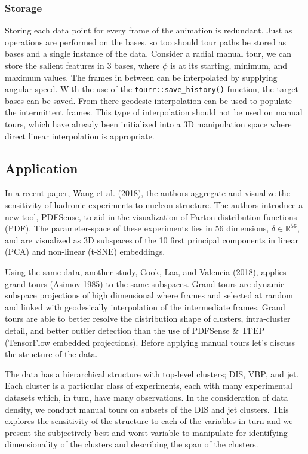 \hypertarget{storage}{%
\subsubsection{Storage}\label{storage}}

Storing each data point for every frame of the animation is redundant.
Just as operations are performed on the bases, so too should tour paths
be stored as bases and a single instance of the data. Consider a radial
manual tour, we can store the salient features in 3 bases, where
\(\phi\) is at its starting, minimum, and maximum values. The frames in
between can be interpolated by supplying angular speed. With the use of
the \texttt{tourr::save\_history()} function, the target bases can be
saved. From there geodesic interpolation can be used to populate the
intermittent frames. This type of interpolation should not be used on
manual tours, which have already been initialized into a 3D manipulation
space where direct linear interpolation is appropriate.

\hypertarget{sec:application}{%
\subsection{Application}\label{sec:application}}

In a recent paper, Wang et al.
(\protect\hyperlink{ref-wang_mapping_2018}{2018}), the authors aggregate
and visualize the sensitivity of hadronic experiments to nucleon
structure. The authors introduce a new tool, PDFSense, to aid in the
visualization of Parton distribution functions (PDF). The
parameter-space of these experiments lies in 56 dimensions,
\(\delta \in \mathbb{R}^{56}\), and are visualized as 3D subspaces of
the 10 first principal components in linear (PCA) and non-linear (t-SNE)
embeddings.

Using the same data, another study, Cook, Laa, and Valencia
(\protect\hyperlink{ref-cook_dynamical_2018}{2018}), applies grand tours
(Asimov \protect\hyperlink{ref-asimov_grand_1985}{1985}) to the same
subspaces. Grand tours are dynamic subspace projections of high
dimensional where frames and selected at random and linked with
geodesically interpolation of the intermediate frames. Grand tours are
able to better resolve the distribution shape of clusters, intra-cluster
detail, and better outlier detection than the use of PDFSense \& TFEP
(TensorFlow embedded projections). Before applying manual tours let's
discuss the structure of the data.

The data has a hierarchical structure with top-level clusters; DIS, VBP,
and jet. Each cluster is a particular class of experiments, each with
many experimental datasets which, in turn, have many observations. In
the consideration of data density, we conduct manual tours on subsets of
the DIS and jet clusters. This explores the sensitivity of the structure
to each of the variables in turn and we present the subjectively best
and worst variable to manipulate for identifying dimensionality of the
clusters and describing the span of the clusters.

